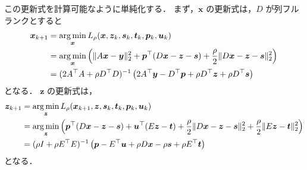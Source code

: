 この更新式を計算可能なように単純化する．
まず，$\bm{x}$ の更新式は，$D$ が列フルランクとすると
\begin{align}
    \bm{x}_{k+1}
     & = \operatorname*{arg \thinspace min}_{\bm{x}}
    L_{\rho}(\bm{x}, \bm{z}_k, \bm{s}_k, \bm{t}_k, \bm{p}_k, \bm{u}_k)
    \notag                                        \\
     & = \operatorname*{arg \thinspace min}_{\bm{x}} \left(
    \|A \bm{x} - \bm{y}\|_2^2
    + \bm{p}^\top (D \bm{x} - \bm{z} - \bm{s})
    + \frac{\rho}{2} \|D \bm{x} - \bm{z} - \bm{s}\|_2^2
    \right)
    \notag                                        \\
     & = (2 A^\top A + \rho D^\top D)^{-1} \left(
    2 A^\top \bm{y} - D^\top \bm{p} + \rho D^\top \bm{z} + \rho D^\top \bm{s}
    \right)
\end{align}
となる．
$\bm{z}$ の更新式は，
\begin{align}
    \bm{z}_{k+1}
     & = \operatorname*{arg \thinspace min}_{\bm{z}}
    L_{\rho}(\bm{x}_{k+1}, \bm{z}, \bm{s}_k, \bm{t}_k, \bm{p}_k, \bm{u}_k)
    \notag                                    \\
     & = \operatorname*{arg \thinspace min}_{\bm{z}} \left(
    \bm{p}^\top (D \bm{x} - \bm{z} - \bm{s})
    + \bm{u}^\top (E \bm{z} - \bm{t})
    + \frac{\rho}{2} \|D \bm{x} - \bm{z} - \bm{s}\|_2^2
    + \frac{\rho}{2} \|E \bm{z} - \bm{t}\|_2^2
    \right)
    \notag                                    \\
     & = (\rho I + \rho E^\top E)^{-1} \left(
    \bm{p} - E^\top \bm{u} + \rho D \bm{x} - \rho \bm{s} + \rho E^\top \bm{t}
    \right)
\end{align}
となる．

